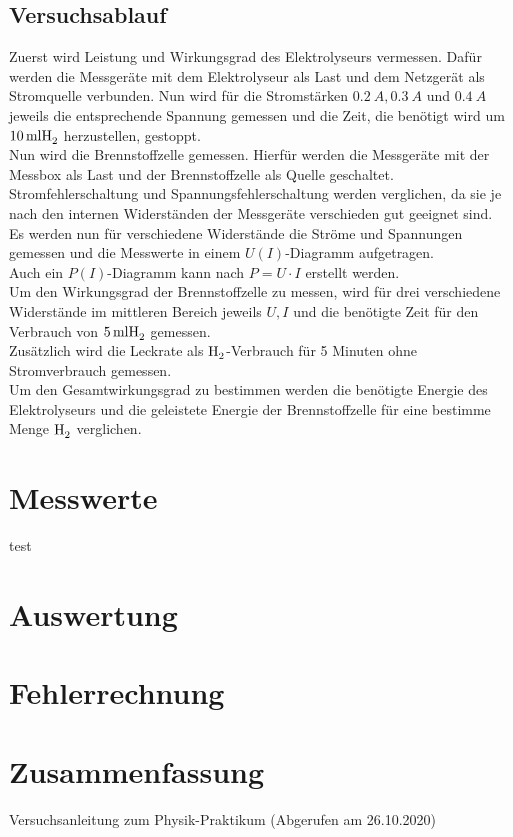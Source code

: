 \documentclass[a4paper,12pt,bibtotocnumbered]{scrartcl}
\numberwithin{equation}{section} %
\begin{document}
\subsection{Versuchsablauf}
Zuerst wird Leistung und Wirkungsgrad des Elektrolyseurs vermessen. Dafür werden die Messgeräte mit dem Elektrolyseur als Last und dem Netzgerät als Stromquelle verbunden. Nun wird für die Stromstärken $\SI{0,2}{A},\SI{0,3}{A}$ und $\SI{0,4}{A}$ jeweils die entsprechende Spannung gemessen und die Zeit, die benötigt wird um $\SI{10}{ml}\ce{H_2}$ herzustellen, gestoppt.\\

Nun wird die Brennstoffzelle gemessen. Hierfür werden die Messgeräte mit der Messbox als Last und der Brennstoffzelle als Quelle geschaltet. Stromfehlerschaltung und Spannungsfehlerschaltung werden verglichen, da sie je nach den internen Widerständen der Messgeräte verschieden gut geeignet sind.\\
Es werden nun für verschiedene Widerstände die Ströme und Spannungen gemessen und die Messwerte in einem $U(I)$-Diagramm aufgetragen. \\
Auch ein $P(I)$-Diagramm kann nach $P=U\cdot I$ erstellt werden.\\

Um den Wirkungsgrad der Brennstoffzelle zu messen, wird für drei verschiedene Widerstände im mittleren Bereich jeweils $U,I$ und die benötigte Zeit für den Verbrauch von $\SI{5}{ml}\ce{H_2}$ gemessen.\\Zusätzlich wird die Leckrate als $\ce{H_2}$-Verbrauch für 5 Minuten ohne Stromverbrauch gemessen. \\

Um den Gesamtwirkungsgrad zu bestimmen werden die benötigte Energie des Elektrolyseurs und die geleistete Energie der Brennstoffzelle für eine bestimme Menge $\ce{H_2}$ verglichen.

\section[Messwerte]{Messwerte}test
\section[Auswertung]{Auswertung}
\section[Fehlerrechnung]{Fehlerrechnung}
\section[Zusammenfassung]{Zusammenfassung}
\begin{thebibliography}{999}
 Versuchsanleitung zum Physik-Praktikum (Abgerufen am 26.10.2020) 
\end{thebibliography}
\end{document}
